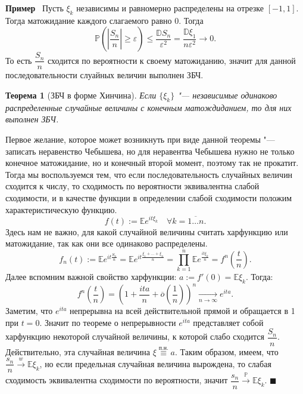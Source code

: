 \documentclass[12pt]{article}
\newtheorem{Th}{Теорема}
\newenvironment{Proof}{\par\noindent{\bf Доказательство}}{$\blacksquare$}
\newenvironment{Ex}{{\bf Пример}\ }{}
\numberwithin{Th}{section}
\numberwithin{Def}{section}
\numberwithin{Lem}{section}
\numberwithin{St}{section}
\numberwithin{equation}{section}
\newcommand\Pro{\mathbb{P}} %
\newcommand\Expec{\mathbb{E}} %
\newcommand\Disp{\mathbb{D}}  %
\newcommand\xequiv[1]{\stackrel{\mathrm{ #1}}{\equiv}}
\begin{document}
\begin{Ex}
    Пусть $\xi_k$ независимы и равномерно распределены на отрезке $[-1, 1]$. Тогда матожидание каждого слагаемого равно $0$. Тогда
    \[
        \Pro \left( \left| \dfrac{S_n}{n} \right| \geqslant \varepsilon \right) \leqslant \dfrac{\Disp S_n}{\varepsilon^2} = \dfrac{\Disp \xi_1}{n \varepsilon^2} \rightarrow 0 
    .\]
    То есть $\dfrac{S_n}{n}$ сходится по вероятности к своему матожиданию, значит для данной последовательности слуайных величин выполнен ЗБЧ.
\end{Ex} 

\begin{Th}[ЗБЧ в форме Хинчина]
    Если $\{ \xi_k \}$ "--- независимые одинаково распределенные случайные величины с конечным матождиданием, то для них выполнен ЗБЧ. 
\end{Th} 

\begin{Proof}
    Первое желание, которое может возникнуть при виде данной теоремы "--- записать неравенство Чебышева, но для неравентва Чебышева нужно не только конечное матожидание, но и конечный второй момент, поэтому так не прокатит.
    Тогда мы воспользуемся тем, что если последовательность случайных величин сходится к числу, то сходимость по вероятности эквивалентна слабой сходимости, и в качестве функции в определении слабой сходимости положим характеристическую функцию.
     \[
         f(t) := \Expec e^{it\xi_k} \quad \forall k=\overline{1 \ldots n}  
     .\]
     Здесь нам не важно, для какой случайной величины считать харфункцию или матожидание, так как они все одинаково распределены.
     \[
         f_n(t) := \Expec e^{it\frac{S_n}{n}} = \Expec e^{it \frac{\xi_1 + \ldots + \xi_n}{n}} = \prod\limits_{k=1}^{n} \Expec e^{\frac{it\xi_k}{n}} = 
         f^{n} \left( \frac{t}{n} \right)
    .\]
    Далее вспомним важной свойство харфункции: $a := f'(0) = \Expec \xi_k$. Тогда: 
    \[
        f^{n} \left( \dfrac{t}{n} \right) = \left( 1 + \dfrac{ita}{n} + \overline{o} \left( \dfrac{1}{n} \right)  \right)^{n} \xrightarrow[n \rightarrow \infty ]{} e^{ita} 
    .\]
    Заметим, что $e^{ita}$ непрерывна на всей действительной прямой и обращается в 1 при $t = 0$. Значит по теореме о непрерывности $e^{ita}$ представляет собой харфункцию некоторой случайной величины, к которой слабо сходится $\dfrac{S_n}{n}$. Действительно, эта случайная величина $\xi \xequiv{\text{п.н.}} a$.
    Таким образом, имеем, что $\dfrac{s_n}{n} \xrightarrow[]{w} \Expec \xi_k$,
    но если предельная случайная величина вырождена, то слабая сходимость эквивалентна сходимости по вероятности, значит $\dfrac{s_n}{n} \xrightarrow[]{\Pro} \Expec \xi_k$.
\end{Proof} 
\end{document}

